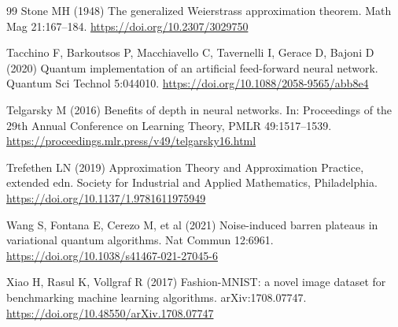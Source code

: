 \documentclass[pdflatex,sn-mathphys,NameDate,iicol]{sn-jnl}
\begin{document}
\begin{thebibliography}{99}
Stone MH (1948) The generalized Weierstrass approximation theorem.
Math Mag 21:167--184.
\url{https://doi.org/10.2307/3029750}

Tacchino F, Barkoutsos P, Macchiavello C, Tavernelli I, Gerace D, Bajoni D
(2020) Quantum implementation of an artificial feed-forward neural network.
Quantum Sci Technol 5:044010.
\url{https://doi.org/10.1088/2058-9565/abb8e4}

Telgarsky M (2016) Benefits of depth in neural networks. In: Proceedings of
the 29th Annual Conference on Learning Theory, PMLR 49:1517--1539.
\url{https://proceedings.mlr.press/v49/telgarsky16.html}

Trefethen LN (2019) Approximation Theory and Approximation Practice,
extended edn. Society for Industrial and Applied Mathematics, Philadelphia.
\url{https://doi.org/10.1137/1.9781611975949}

Wang S, Fontana E, Cerezo M, et al (2021) Noise-induced barren plateaus in
variational quantum algorithms. Nat Commun 12:6961.
\url{https://doi.org/10.1038/s41467-021-27045-6}

Xiao H, Rasul K, Vollgraf R (2017) Fashion-MNIST: a novel image dataset for
benchmarking machine learning algorithms. arXiv:1708.07747.
\url{https://doi.org/10.48550/arXiv.1708.07747}

\end{thebibliography}
\end{document}
